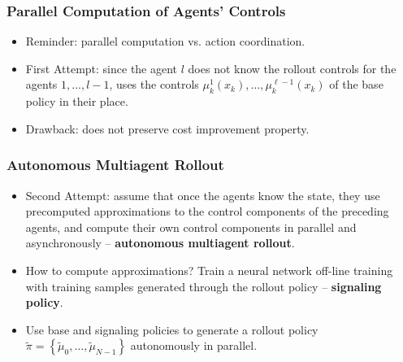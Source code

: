 \documentclass{beamer}
\begin{document}


    \begin{frame}
        \frametitle{Parallel Computation of Agents' Controls}
        \begin{itemize}
            \item Reminder: parallel computation vs. action coordination.
                        
            \item First Attempt: since the agent $l$
            does not know the 
            rollout controls for the agents $1, ..., l − 1$, 
            uses
            the controls $\mu_{k}^{1}\left(x_{k}\right), \ldots, \mu_{k}^{\ell-1}\left(x_{k}\right)$ of the base policy in their
            place.
            
            \item Drawback: does not preserve cost improvement property. 
                        
        \end{itemize}
    \end{frame}



\begin{frame}
	\frametitle{Autonomous Multiagent Rollout}
	\begin{itemize}
		\item Second Attempt: assume that once the agents know the
		state, they use precomputed approximations to the control
		components of the preceding agents, and compute their own
		control components in parallel and asynchronously -- 
		\textbf{autonomous multiagent rollout}.
		
		
		\item How to compute approximations? Train a neural network 
		off-line training  with training samples generated
		through the rollout policy -- \textbf{signaling policy}.
		
				
		\item Use base and signaling policies 
		to generate a rollout policy 
		$\tilde{\pi}=\left\{\tilde{\mu}_{0}, \ldots, \tilde{\mu}_{N-1}\right\}$
		autonomously in parallel.
		
	\end{itemize}
\end{frame}

\end{document}
